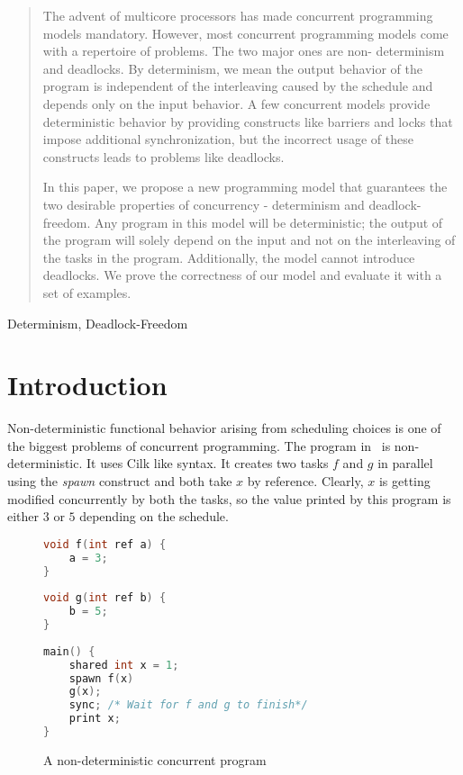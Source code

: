 \documentclass[10pt, conference, compsocconf]{IEEEtran}
\begin{document}
\begin{abstract}
The advent of multicore processors has made concurrent programming models mandatory. However, most concurrent programming models come with a repertoire of problems.
The two major ones are non- 
determinism and deadlocks. By determinism, we mean the output behavior of the program is 
independent of the interleaving caused by the schedule and depends only on the 
input behavior. A few concurrent models provide deterministic behavior by providing constructs like barriers and locks that impose additional synchronization, 
but the incorrect usage of these constructs 
leads to problems like deadlocks. 

In this paper, we propose a new programming model that guarantees
the two desirable properties of concurrency - determinism and deadlock-freedom.
Any program in this model will be deterministic; the output of the program
will solely depend on the input and not on the interleaving of the tasks in the program.
Additionally, the model cannot  introduce deadlocks.
We prove the correctness of our model and evaluate it with a set of examples.

\end{abstract}

\begin{IEEEkeywords}
Determinism, Deadlock-Freedom

\end{IEEEkeywords}

\section{Introduction}

Non-deterministic functional behavior arising from scheduling choices is one of the biggest problems of concurrent programming. The program in~ is non-deterministic. It uses 
Cilk\cite{blumofe1995cilk} 
like syntax. It creates two tasks $f$ and $g$ in parallel using the \emph{spawn} construct and both take $x$ by reference. Clearly, $x$ is getting 
modiﬁed concurrently by both the tasks, so the value printed by this program is either $3$ or $5$ 
depending on the schedule. 

\begin{figure}[htbp]
\begin{lstlisting}[language=C]
void f(int ref a) { 
    a = 3; 
} 
 
void g(int ref b) { 
    b = 5; 
} 
 
main() { 
    shared int x = 1; 
    spawn f(x) 
    g(x); 
    sync; /* Wait for f and g to finish*/  
    print x; 
} 
\end{lstlisting}
\caption{A non-deterministic concurrent program}
\label{fig:non-det}
\end{figure}
\end{document}
